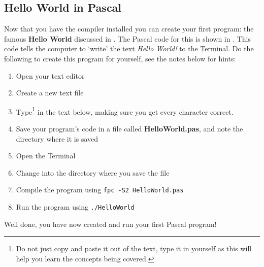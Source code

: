 \clearpage
\subsection{Hello World in Pascal} %
\label{sub:hello_world_in_pascal}

Now that you have the compiler installed you can create your first program: the famous \textbf{Hello World} discussed in . The Pascal code for this is shown in . This code tells the computer to `write' the text \emph{Hello World!} to the Terminal. Do the following to create this program for yourself, see the notes below for hints:

\begin{enumerate}
  \item Open your text editor
  \item Create a new text file
  \item Type\footnote{Do not just copy and paste it out of the text, type it in yourself as this will help you learn the concepts being covered.} in the text below, making sure you get every character correct.
  \item Save your program's code in a file called \textbf{HelloWorld.pas}, and note the directory where it is saved
  \item Open the Terminal
  \item Change into the directory where you save the file
  \item Compile the program using \texttt{fpc -S2 HelloWorld.pas}
  \item Run the program using \texttt{./HelloWorld}
\end{enumerate}

Well done, you have now created and run your first Pascal program!

\passection
{
}


